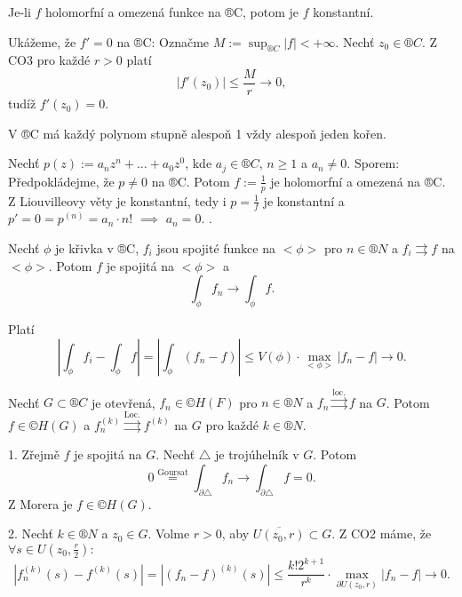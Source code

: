 \documentclass[12pt]{article}					%
\begin{document}
\begin{veta}[Liouville]
	Je-li $f$ holomorfní a omezená funkce na ®C, potom je $f$ konstantní.

	\begin{dukazin}
		Ukážeme, že $f' = 0$ na ®C: Označme $M := \sup_{®C} |f| < +∞$. Nechť $z_0 \in ®C$. Z CO3 pro každé $r > 0$ platí
		$$ |f'(z_0)| ≤ \frac{M}{r} \rightarrow 0, $$
		tudíž $f'(z_0) = 0$.
	\end{dukazin}
\end{veta}

\begin{dusledek}
	V ®C má každý polynom stupně alespoň 1 vždy alespoň jeden kořen.

	\begin{dukazin}
		Nechť $p(z) := a_n z^n + … + a_0 z^0$, kde $a_j \in ®C$, $n ≥ 1$ a $a_n ≠ 0$. Sporem: Předpokládejme, že $p ≠ 0$ na ®C. Potom $f:=\frac{1}{p}$ je holomorfní a omezená na ®C. Z Liouvilleovy věty je konstantní, tedy i $p = \frac{1}{f}$ je konstantní a $p' = 0 = p^{(n)} = a_n · n!$ $\implies$ $a_n = 0$. \lightning.
	\end{dukazin}
\end{dusledek}

\begin{lemma}
	Nechť $\phi$ je křivka v ®C, $f_i$ jsou spojité funkce na $<\phi>$ pro $n \in ®N$ a $f_i \rightrightarrows f$ na $<\phi>$. Potom $f$ je spojitá na $<\phi>$ a
	$$ \int_\phi f_n \rightarrow \int_\phi f. $$

	\begin{dukazin}
		Platí
		$$ \left|\int_\phi f_i - \int_\phi f\right| = \left|\int_\phi (f_n - f)\right| ≤ V(\phi)·\max_{<\phi>} |f_n - f| \rightarrow 0. $$
	\end{dukazin}
\end{lemma}

\begin{veta}[Weierstrass]
	Nechť $G \subset ®C$ je otevřená, $f_n \in ©H(F)$ pro $n \in ®N$ a $f_n \overset{\text{loc.}}\rightrightarrows f$ na $G$. Potom $f \in ©H(G)$ a $f_n^{(k)} \overset{\text{Loc.}}\rightrightarrows f^{(k)}$ na $G$ pro každé $k \in ®N$.

	\begin{dukazin}
		1. Zřejmě $f$ je spojitá na $G$. Nechť $\triangle$ je trojúhelník v $G$. Potom
		$$ 0 \overset{\text{Goursat}}= \int_{\partial \triangle} f_n \rightarrow \int_{\partial \triangle} f = 0. $$
		Z Morera je $f \in ©H(G)$.

		2. Nechť $k \in ®N$ a $z_0 \in G$. Volme $r > 0$, aby $\overline{U(z_0, r)} \subset G$. Z CO2 máme, že $\forall s \in U(z_0, \frac{r}{2}):$
		$$ |f_n^{(k)}(s) - f^{(k)}(s)| = |(f_n - f)^{(k)}(s)| ≤ \frac{k! 2^{k+1}}{r^k}·\max_{\partial U(z_0, r)} |f_n - f| \rightarrow 0. $$
	\end{dukazin}
\end{veta}
\end{document}

